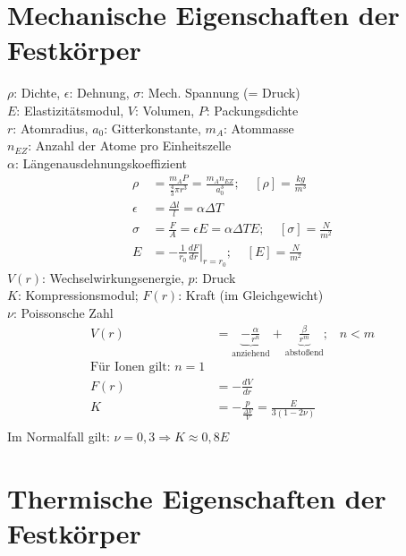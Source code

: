 \documentclass[a4paper,twocolumn,10pt]{article}
\begin{document}
\section{Mechanische Eigenschaften der Festkörper}
$\rho$: Dichte, $\epsilon$: Dehnung, $\sigma$: Mech. Spannung (= Druck)\\
$E$: Elastizitätsmodul, $V$: Volumen, $P$: Packungsdichte\\
$r$: Atomradius, $a_0$: Gitterkonstante, $m_A$: Atommasse\\
$n_{EZ}$: Anzahl der Atome pro Einheitszelle\\
$\alpha$: Längenausdehnungskoeffizient
\begin{equation*}
\begin{split}
\rho&=\frac{m_AP}{\frac{4}{3}\pi r^3}=\frac{m_An_{EZ}}{a_0^3};\;\;\;\;[\rho]=\frac{kg}{m^3}\\
\epsilon&=\frac{\Delta l}{l}=\alpha\Delta T\\
\sigma&=\frac{F}{A}=\epsilon E=\alpha\Delta TE;\;\;\;\;[\sigma]=\frac{N}{m^2}\\
E&=-\frac{1}{r_0}\left.\frac{dF}{dr}\right|_{r=r_0};\;\;\;\;[E]=\frac{N}{m^2}
\end{split}
\end{equation*}
$V(r)$: Wechselwirkungsenergie, $p$: Druck\\
$K$: Kompressionsmodul; $F(r)$: Kraft (im Gleichgewicht)\\
$\nu$: Poissonsche Zahl
\begin{equation*}
\begin{split}
V(r)&=\underbrace{-\frac{\alpha}{r^n}}_{\text{anziehend}}+\underbrace{\frac{\beta}{r^m}}_{\text{abstoßend}};\;\;\;n<m\\
\text{Für Ionen gilt: }n=1\\
F(r)&=-\frac{dV}{dr}\\
K&=-\frac{p}{\frac{\Delta V}{V}}=\frac{E}{3(1-2\nu)}\\
\end{split}
\end{equation*}
Im Normalfall gilt: $\nu =0,3\Rightarrow K\approx 0,8E$

\section{Thermische Eigenschaften der Festkörper}
\end{document}
